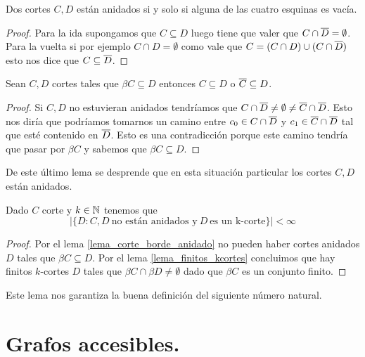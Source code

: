 \documentclass[tesis.tex]{subfiles}
\begin{document}
\begin{lema}
	Dos cortes $C,D$ están anidados si y solo si alguna de las cuatro esquinas es vacía.
\end{lema}
\begin{proof}
	Para la ida supongamos que $C \subseteq D$ luego tiene que valer que $C \cap \overline D = \emptyset$.
	Para la vuelta si por ejemplo $C \cap D = \emptyset$ como vale que $C = (C \cap D) \cup (C \cap \overline D)$ esto nos dice que $C \subseteq \overline D$.
	
\end{proof}

\begin{lema}\label{lema_corte_borde_anidado}
	Sean $C,D$ cortes tales que $\beta C \subseteq D$ entonces $C \subseteq D$ o $\overline C \subseteq D$.
\end{lema}
\begin{proof}
	Si $C,D$ no estuvieran anidados tendríamos que $C \cap \overline D \neq \emptyset \neq \overline C \cap \overline D$.
	Esto nos diría que podríamos tomarnos un camino entre $c_0 \in C \cap \overline D$ y $c_1 \in \overline C \cap \overline D$ tal que esté contenido en $\overline D$.
	Esto es una contradicción porque este camino tendría que pasar por $\beta C$ y sabemos que $\beta C \subseteq D$.
	
\end{proof}

De este último lema se desprende que en esta situación particular los cortes $C,D$ están anidados.

\begin{lema}
	Dado $C$ corte y $k \in \mathbb{N}$ tenemos que 
	\[
	| \{  D : C, D \ \text{no están anidados y} \ D \ \text{es un k-corte}   \} | < \infty
	\]
\end{lema}
\begin{proof}
	Por el lema \ref{lema_corte_borde_anidado} no pueden haber cortes anidados $D$ tales que $\beta C \subseteq D$.
	Por el lema \ref{lema_finitos_kcortes} concluimos que hay finitos $k$-cortes $D$ tales que $\beta C \cap \beta D \neq \emptyset$ dado que $\beta C$ es un conjunto finito.
				
\end{proof}

Este lema nos garantiza la buena definición del siguiente número natural.




\section{Grafos accesibles.}\label{secc_grafos_accesibles}
\end{document}

